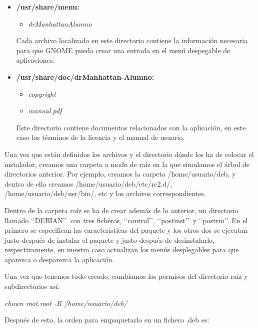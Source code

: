 \begin{itemize}
    \item {\bfseries /usr/share/menu:}
        \begin{itemize}
            \item \emph{drManhattanAlumno}
        \end{itemize}

    Cada archivo localizado en este directorio contiene la información necesaria para que GNOME pueda crear una entrada en el menú despegable de aplicaciones.


    \item {\bfseries /usr/share/doc/drManhattan-Alumno:}
        \begin{itemize}
            \item \emph{copyright}
            \item \emph{manual.pdf}
        \end{itemize}

    Este directorio contiene documentos relacionados con la aplicación, en este caso los términos de la licencia y el manual de usuario.
\end{itemize}



Una vez que están definidos los archivos y el directorio dónde los ha de colocar el instalador, creamos una carpeta a modo de raíz en la que simulamos el árbol de directorios anterior. Por ejemplo, creamos la carpeta /home/usuario/deb, y dentro de ella creamos /home/usuario/deb/etc/rc2.d/, /home/usuario/deb/usr/bin/, etc y los archivos correspondientes.
\newline

Dentro de la carpeta raíz se ha de crear además de lo anterior, un directorio llamado \lq\lq DEBIAN\rq \rq \ con tres ficheros, \lq\lq control\rq \rq, \lq\lq postinst\rq \rq \ y \lq\lq postrm\rq \rq . En el primero se especifican las características del paquete y los otros dos se ejecutan justo después de instalar el paquete y justo después de desinstalarlo, respectivamente, en nuestro caso actualizan los menús desplegables para que aparezca o desparezca la aplicación.
\newline

Una vez que tenemos todo creado, cambiamos los permisos del directorio raíz y subdirectorios así:

\begin{center}
    \emph{chown root.root -R /home/usuario/deb/}
\end{center}

Después de esto, la orden para empaquetarlo en un fichero .deb es:

